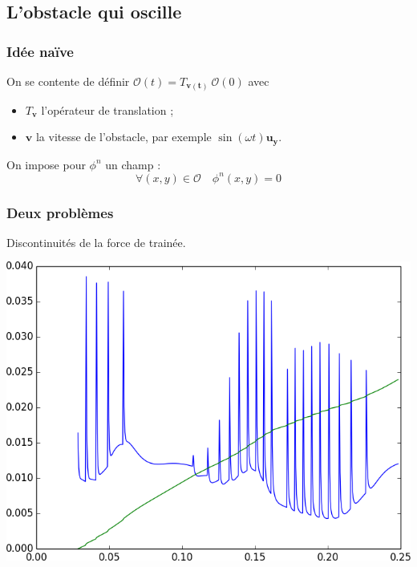 \documentclass{beamer}
\renewcommand{\O}{\mathcal{O}}
\newcommand{\vect}[1]{\boldsymbol{#1}}
\begin{document}
  \subsection{L'obstacle qui oscille}
  \begin{frame}
    \frametitle{Idée naïve}
    On se contente de définir $\O(t) = T_{\vect{v(t)}}\ \O(0)$ avec 
    \begin{itemize}
      \item $T_{\vect{v}}$ l'opérateur de translation ;
      \item $\vect{v}$ la vitesse de l'obstacle, par exemple $\sin(\omega
        t)\vect{u_y}$.
    \end{itemize}
    \bigskip
   On impose pour $\phi^n$ un champ :
    \[ \forall (x,y)\in\O \quad \phi^n(x,y) = 0 \]
  \end{frame}
  \begin{frame}
    \frametitle{Deux problèmes}
    Discontinuités de la force de trainée.
    \begin{center}
      \includegraphics[height=0.7\textheight]{penalisation.png}
    \end{center}
  \end{frame}
\end{document}
